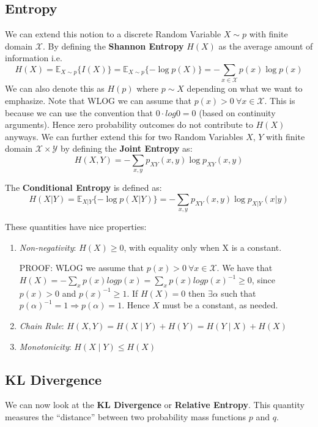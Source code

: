 \documentclass[]{article}
\theoremstyle{mattstyle}
\theoremstyle{definition}
\begin{document}
\subsection{Entropy}
We can extend this notion to a discrete Random Variable $X\sim p$ with finite domain $\mathcal{X}$. By defining the \textbf{Shannon Entropy} $H(X)$ as the average amount of information i.e. 
\begin{equation}
H(X) = \mathbb{E}_{X\sim p}\{I(X)\} = \mathbb{E}_{X\sim p}\{-\log p(X)\} = -\sum_{x\in\mathcal{X}}p(x)\log p(x)
\end{equation}
We can also denote this as $H(p)$ where $p \sim X$ depending on what we want to emphasize. Note that WLOG we can assume that \(p(x)>0 \ \forall x\in\mathcal{X}\). This is because we can use the convention that \(0\cdot log0 = 0\) (based on continuity arguments). Hence zero probability outcomes do not contribute to $H(X)$ anyways. We can further extend this for two Random Variables $X$, $Y$ with finite domain \(\mathcal{X}\times\mathcal{Y}\) by defining the \textbf{Joint Entropy} as:
\begin{equation}
H(X,Y) = -\sum_{x,y}p_{XY}(x,y)\log p_{XY}(x,y)
\end{equation}

The \textbf{Conditional Entropy} is defined as:
\begin{equation}
H(X|Y) = \mathbb{E}_{X|Y}\{-\log p(X|Y)\} = -\sum_{x,y}p_{XY}(x,y)\log p_{X|Y}(x|y)
\end{equation}

These quantities have nice properties:
\begin{enumerate}
	\item \emph{Non-negativity}: \(H(X)\ge0\), with equality only when X is a constant.
	
	PROOF: WLOG we assume that \(p(x)>0 \ \forall x\in\mathcal{X}\). We have that \(H(X) = -\sum_{x} p(x)logp(x) = \sum_{x} p(x)logp(x)^{-1}\ge0\), since \(p(x)>0\) and \(p(x)^{-1} \ge 1\). If \(H(X)=0\) then \(\exists \alpha\) such that \(p(\alpha)^{-1}=1 \Rightarrow p(\alpha)=1\). Hence \(X\) must be a constant, as needed.
	
	\item \emph{Chain Rule}: $H(X,Y) = H(X \mid Y) + H(Y) = H(Y \mid X) + H(X)$ 
	\item \emph{Monotonicity}: $H(X\mid Y) \le H(X)$ 
\end{enumerate}

\subsection{KL Divergence}
We can now look at the \textbf{KL Divergence} or \textbf{Relative Entropy}. This quantity measures the ``distance'' between two probability mass functions $p$ and $q$.
\end{document}
